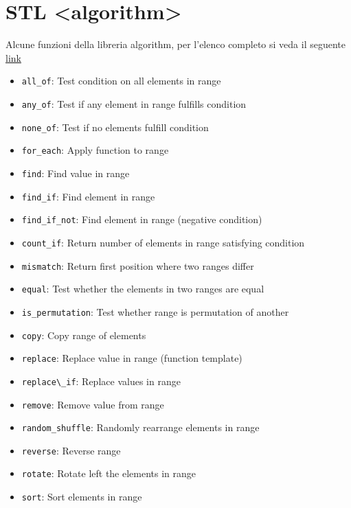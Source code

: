 \section{STL <algorithm>}
Alcune funzioni della libreria algorithm, per l'elenco completo si veda il seguente \href{https://cplusplus.com/reference/algorithm/}{link}

\begin{itemize}
    \item \verb|all_of|: Test condition on all elements in range
    \item \verb|any_of|:	Test if any element in range fulfills condition
    \item \verb|none_of|:	Test if no elements fulfill condition
    \item \verb|for_each|:	Apply function to range
    \item \verb|find|:	Find value in range
    \item \verb|find_if|:	Find element in range
    \item \verb|find_if_not|:	Find element in range (negative condition)
    \item \verb|count_if|:	Return number of elements in range satisfying condition
    \item \verb|mismatch|:	Return first position where two ranges differ
    \item \verb|equal|:	Test whether the elements in two ranges are equal
    \item \verb|is_permutation|:	Test whether range is permutation of another
    \item \verb|copy|:	Copy range of elements
    \item \verb|replace|:	Replace value in range (function template)
    \item \verb|replace\_if|:	Replace values in range
    \item \verb|remove|:	Remove value from range
    \item \verb|random_shuffle|:	Randomly rearrange elements in range
    \item \verb|reverse|:	Reverse range
    \item \verb|rotate|:	Rotate left the elements in range
    \item \verb|sort|:	Sort elements in range
\end{itemize}